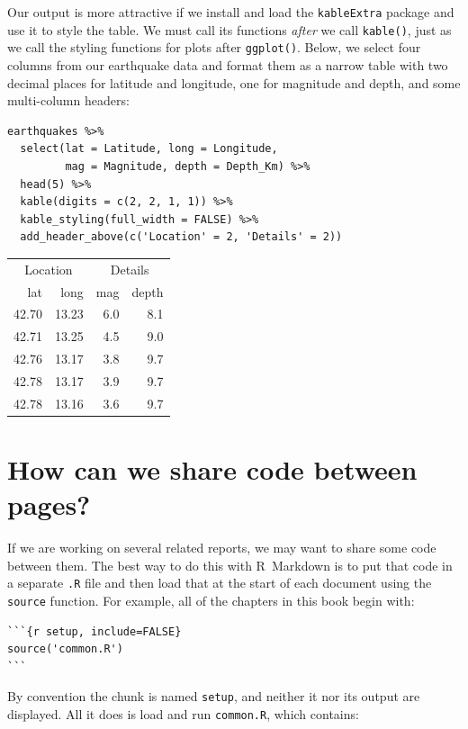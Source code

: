 Our output is more attractive if we install and load the \texttt{kableExtra} package
and use it to style the table.
We must call its functions \emph{after} we call \texttt{kable()},
just as we call the styling functions for plots after \texttt{ggplot()}.
Below,
we select four columns from our earthquake data and format them as a narrow table
with two decimal places for latitude and longitude,
one for magnitude and depth,
and some multi-column headers:

\begin{lstlisting}
earthquakes %>%
  select(lat = Latitude, long = Longitude,
         mag = Magnitude, depth = Depth_Km) %>%
  head(5) %>%
  kable(digits = c(2, 2, 1, 1)) %>%
  kable_styling(full_width = FALSE) %>%
  add_header_above(c('Location' = 2, 'Details' = 2))
\end{lstlisting}

\begin{table}[H]
\centering
\begin{tabular}{r|r|r|r}
\hline
\multicolumn{2}{c|}{Location} & \multicolumn{2}{c}{Details} \\
\cline{1-2} \cline{3-4}
lat & long & mag & depth\\
\hline
42.70 & 13.23 & 6.0 & 8.1\\
\hline
42.71 & 13.25 & 4.5 & 9.0\\
\hline
42.76 & 13.17 & 3.8 & 9.7\\
\hline
42.78 & 13.17 & 3.9 & 9.7\\
\hline
42.78 & 13.16 & 3.6 & 9.7\\
\hline
\end{tabular}
\end{table}

\section{How can we share code between pages?}

If we are working on several related reports,
we may want to share some code between them.
The best way to do this with R~Markdown is to put that code in a separate \texttt{.R} file
and then load that at the start of each document using the \texttt{source} function.
For example,
all of the chapters in this book begin with:

\begin{lstlisting}
```{r setup, include=FALSE}
source('common.R')
```
\end{lstlisting}

By convention the chunk is named \texttt{setup},
and neither it nor its output are displayed.
All it does is load and run \texttt{common.R},
which contains:

